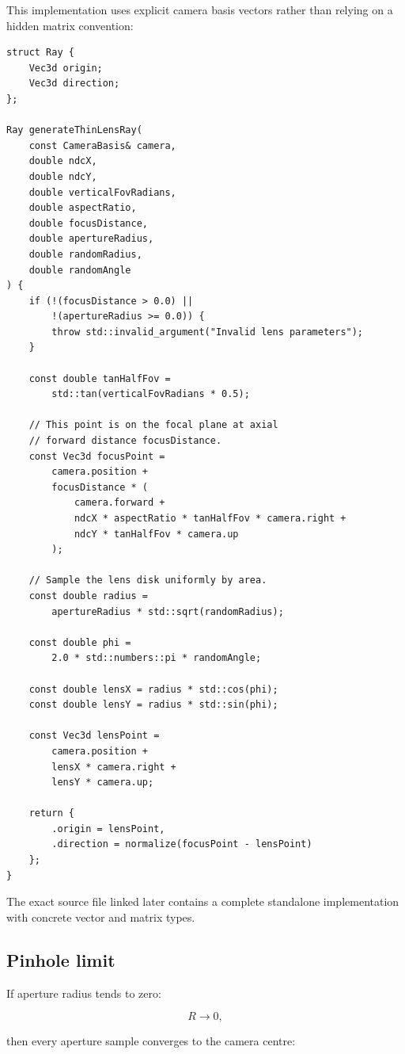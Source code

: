 This implementation uses explicit camera basis vectors rather than relying on a hidden matrix convention:

\begin{verbatim}
struct Ray {
    Vec3d origin;
    Vec3d direction;
};

Ray generateThinLensRay(
    const CameraBasis& camera,
    double ndcX,
    double ndcY,
    double verticalFovRadians,
    double aspectRatio,
    double focusDistance,
    double apertureRadius,
    double randomRadius,
    double randomAngle
) {
    if (!(focusDistance > 0.0) ||
        !(apertureRadius >= 0.0)) {
        throw std::invalid_argument("Invalid lens parameters");
    }

    const double tanHalfFov =
        std::tan(verticalFovRadians * 0.5);

    // This point is on the focal plane at axial
    // forward distance focusDistance.
    const Vec3d focusPoint =
        camera.position +
        focusDistance * (
            camera.forward +
            ndcX * aspectRatio * tanHalfFov * camera.right +
            ndcY * tanHalfFov * camera.up
        );

    // Sample the lens disk uniformly by area.
    const double radius =
        apertureRadius * std::sqrt(randomRadius);

    const double phi =
        2.0 * std::numbers::pi * randomAngle;

    const double lensX = radius * std::cos(phi);
    const double lensY = radius * std::sin(phi);

    const Vec3d lensPoint =
        camera.position +
        lensX * camera.right +
        lensY * camera.up;

    return {
        .origin = lensPoint,
        .direction = normalize(focusPoint - lensPoint)
    };
}
\end{verbatim}

The exact source file linked later contains a complete standalone implementation with concrete vector and matrix types.

\subsection{Pinhole limit}\label{02-foundations-ii-ch036-pinhole-limit}

If aperture radius tends to zero:

\[ R\to0, \]

then every aperture sample converges to the camera centre:

